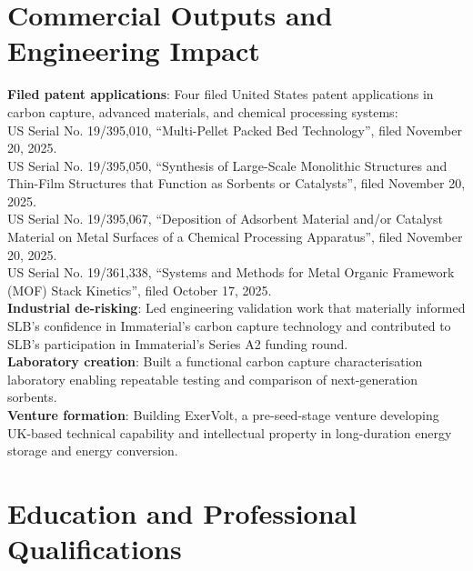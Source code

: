 \documentclass{../../templates/karthicv-single}
\begin{document}
\section{Commercial Outputs and Engineering Impact}

\textbf{Filed patent applications}: Four filed United States patent applications in carbon capture, advanced materials, and chemical processing systems:\\
US Serial No. 19/395,010, ``Multi-Pellet Packed Bed Technology'', filed November 20, 2025.\\
US Serial No. 19/395,050, ``Synthesis of Large-Scale Monolithic Structures and Thin-Film Structures that Function as Sorbents or Catalysts'', filed November 20, 2025.\\
US Serial No. 19/395,067, ``Deposition of Adsorbent Material and/or Catalyst Material on Metal Surfaces of a Chemical Processing Apparatus'', filed November 20, 2025.\\
US Serial No. 19/361,338, ``Systems and Methods for Metal Organic Framework (MOF) Stack Kinetics'', filed October 17, 2025.\\
\textbf{Industrial de-risking}: Led engineering validation work that materially informed SLB's confidence in Immaterial's carbon capture technology and contributed to SLB's participation in Immaterial's Series A2 funding round.\\
\textbf{Laboratory creation}: Built a functional carbon capture characterisation laboratory enabling repeatable testing and comparison of next-generation sorbents.\\
\textbf{Venture formation}: Building ExerVolt, a pre-seed-stage venture developing UK-based technical capability and intellectual property in long-duration energy storage and energy conversion.\\

\section{Education and Professional Qualifications}
\end{document}

